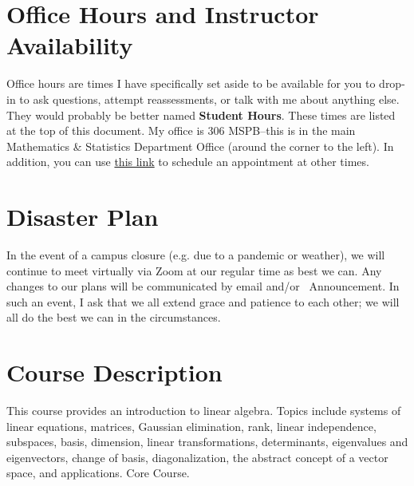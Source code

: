 \documentclass{article}
\begin{document}
\section*{\fontsize{12}{15}\selectfont Office Hours and Instructor Availability}

Office hours are times I have specifically set aside to be available for you to drop-in to ask questions, attempt reassessments, or talk with me about anything else. They would probably be better named \textbf{Student Hours}.  These times are listed at the top of this document. My office is 306 MSPB--this is in the main Mathematics \& Statistics Department Office (around the corner to the left). In addition, you can use \href{https://calendly.com/dr-lewis/10min}{this link} to schedule an appointment at other times.

\section*{\fontsize{12}{15}\selectfont Disaster Plan}
In the event of a campus closure (e.g. due to a pandemic or weather), we will continue to meet virtually via Zoom at our regular time as best we can. Any changes to our plans will be communicated by email and/or \LMS\ Announcement. In such an event, I ask that we all extend grace and patience to each other; we will all do the best we can in the circumstances.

\section*{\fontsize{12}{15}\selectfont Course Description}
This course provides an introduction to linear algebra. Topics include systems of linear equations, matrices, Gaussian elimination, rank, linear independence, subspaces, basis, dimension, linear transformations, determinants, eigenvalues and eigenvectors, change of basis, diagonalization, the abstract concept of a vector space, and applications. Core Course.
\end{document}
